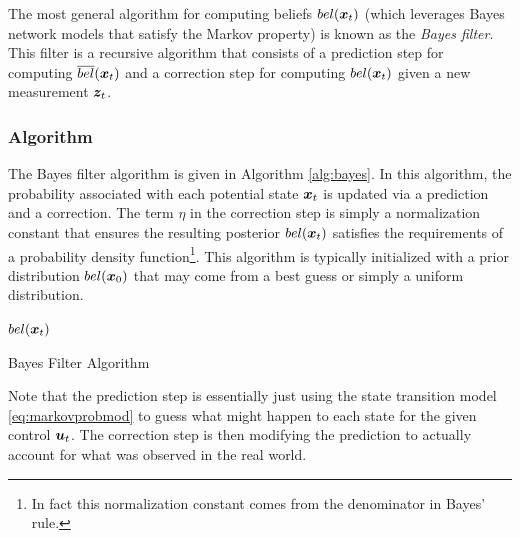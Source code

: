 The most general algorithm for computing beliefs $bel(\bm{x}_t)$ (which leverages Bayes network models that satisfy the Markov property) is known as the \textit{Bayes filter}. This filter is a recursive algorithm that consists of a prediction step for computing $\overline{bel}(\bm{x}_t)$ and a correction step for computing $bel(\bm{x}_t)$ given a new measurement $\bm{z}_t$.

\subsubsection{Algorithm}
The Bayes filter algorithm is given in Algorithm \ref{alg:bayes}. In this algorithm, the probability associated with each potential state $\bm{x}_t$ is updated via a prediction and a correction. The term $\eta$ in the correction step is simply a normalization constant that ensures the resulting posterior $bel(\bm{x}_{t})$ satisfies the requirements of a probability density function\footnote{In fact this normalization constant comes from the denominator in Bayes' rule.}. This algorithm is typically initialized with a prior distribution $bel(\bm{x}_{0})$ that may come from a best guess or simply a uniform distribution.
\begin{algorithm}[ht]
 \Return $bel(\bm{x}_{t})$
 \caption{Bayes Filter Algorithm}
 \label{alg:bayes}
\end{algorithm}
Note that the prediction step is essentially just using the state transition model \eqref{eq:markovprobmod} to guess what might happen to each state for the given control $\bm{u}_t$. The correction step is then modifying the prediction to actually account for what was observed in the real world.

